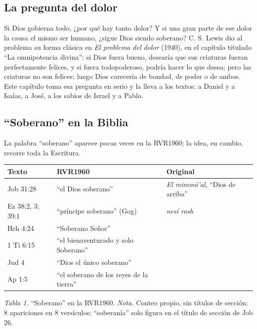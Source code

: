 
\subsection{La pregunta del dolor}
Si Dios gobierna todo, ¿por qué hay tanto dolor? Y si una gran parte de ese dolor la causa el mismo ser humano, ¿sigue Dios siendo soberano? C. S. Lewis dio al problema su forma clásica en \emph{El problema del dolor} (1940), en el capítulo titulado ``La omnipotencia divina'': si Dios fuera bueno, desearía que sus criaturas fueran perfectamente felices, y si fuera todopoderoso, podría hacer lo que desea; pero las criaturas no son felices; luego Dios carecería de bondad, de poder o de ambos. Este capítulo toma esa pregunta en serio y la lleva a los textos: a Daniel y a Isaías, a José, a los sabios de Israel y a Pablo.

\subsection{“Soberano” en la Biblia}
La palabra ``soberano'' aparece pocas veces en la RVR1960; la idea, en cambio, recorre toda la Escritura.

\begin{center}\small\renewcommand{\arraystretch}{1.18}
\begin{tabular}{@{}L{2.6cm}L{4.4cm}L{6.6cm}@{}}
\toprule
\textbf{Texto} & \textbf{RVR1960} & \textbf{Original} \\ \midrule
Job 31:28 & ``el Dios soberano'' &  \emph{El mimmá'al}, ``Dios de arriba'' \\
Ez 38:2, 3; 39:1 & ``príncipe soberano'' (Gog) &  \emph{nesí rosh} \\
Hch 4:24 & ``Soberano Señor'' &  \\
1 Ti 6:15 & ``el bienaventurado y solo Soberano'' &  \\
Jud 4 & ``Dios el único soberano'' &  \\
Ap 1:5 & ``el soberano de los reyes de la tierra'' &  \\
\bottomrule
\end{tabular}\par
{\footnotesize\color{gris}\textit{Tabla 1.} ``Soberano'' en la RVR1960. \textit{Nota.} Conteo propio, sin títulos de sección: 8 apariciones en 8 versículos; ``soberanía'' solo figura en el título de sección de Job 26.}
\end{center}


